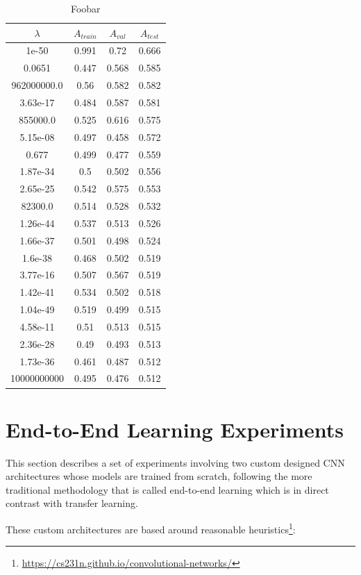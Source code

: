 \begin{table}[ht]
\centering
\begin{tabular}{ |c|c|c|c| }
\hline
$\lambda$ & $A_{train}$ & $A_{val}$ & $A_{test}$ \\
\hline
1e-50 & 0.991 & 0.72 & 0.666 \\
0.0651 & 0.447 & 0.568 & 0.585 \\
962000000.0 & 0.56 & 0.582 & 0.582 \\
3.63e-17 & 0.484 & 0.587 & 0.581 \\
855000.0 & 0.525 & 0.616 & 0.575 \\
5.15e-08 & 0.497 & 0.458 & 0.572 \\
0.677 & 0.499 & 0.477 & 0.559 \\
1.87e-34 & 0.5 & 0.502 & 0.556 \\
2.65e-25 & 0.542 & 0.575 & 0.553 \\
82300.0 & 0.514 & 0.528 & 0.532 \\
1.26e-44 & 0.537 & 0.513 & 0.526 \\
1.66e-37 & 0.501 & 0.498 & 0.524 \\
1.6e-38 & 0.468 & 0.502 & 0.519 \\
3.77e-16 & 0.507 & 0.567 & 0.519 \\
1.42e-41 & 0.534 & 0.502 & 0.518 \\
1.04e-49 & 0.519 & 0.499 & 0.515 \\
4.58e-11 & 0.51 & 0.513 & 0.515 \\
2.36e-28 & 0.49 & 0.493 & 0.513 \\
1.73e-36 & 0.461 & 0.487 & 0.512 \\
10000000000 & 0.495 & 0.476 & 0.512 \\
\hline
\end{tabular}
\caption{Foobar}
\label{table:foobar}
\end{table}





\section{End-to-End Learning Experiments}

This section describes a set of experiments involving two custom designed \ac{CNN} architectures whose models are trained from scratch, following the more traditional methodology that is called end-to-end learning which is in direct contrast with transfer learning.

These custom architectures are based around reasonable heuristics\footnote{\url{https://cs231n.github.io/convolutional-networks/}}:

